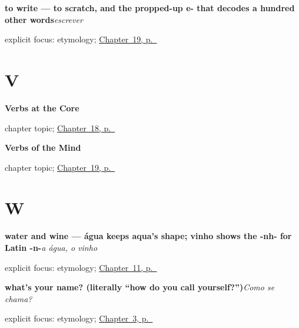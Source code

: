 \noindent\begin{minipage}[t]{\linewidth}
\raggedright
\textbf{to write — to scratch, and the propped-up e- that decodes a hundred other words}\enspace\emph{escrever}\par
\footnotesize explicit focus: etymology; \hyperref[ch:pt-mind-verbs]{Chapter~19, p.~\pageref*{ch:pt-mind-verbs}}
\end{minipage}\par\smallskip

\section*{V}

\noindent\begin{minipage}[t]{\linewidth}
\raggedright
\textbf{Verbs at the Core}\par
\footnotesize chapter topic; \hyperref[ch:pt-core-verbs]{Chapter~18, p.~\pageref*{ch:pt-core-verbs}}
\end{minipage}\par\smallskip

\noindent\begin{minipage}[t]{\linewidth}
\raggedright
\textbf{Verbs of the Mind}\par
\footnotesize chapter topic; \hyperref[ch:pt-mind-verbs]{Chapter~19, p.~\pageref*{ch:pt-mind-verbs}}
\end{minipage}\par\smallskip

\section*{W}

\noindent\begin{minipage}[t]{\linewidth}
\raggedright
\textbf{water and wine — água keeps aqua's shape; vinho shows the -nh- for Latin -n-}\enspace\emph{a água, o vinho}\par
\footnotesize explicit focus: etymology; \hyperref[ch:pt-bread-water-wine]{Chapter~11, p.~\pageref*{ch:pt-bread-water-wine}}
\end{minipage}\par\smallskip

\noindent\begin{minipage}[t]{\linewidth}
\raggedright
\textbf{what's your name? (literally \textquotedblleft{}how do you call yourself?\textquotedblright{})}\enspace\emph{Como se chama?}\par
\footnotesize explicit focus: etymology; \hyperref[ch:pt-introductions]{Chapter~3, p.~\pageref*{ch:pt-introductions}}
\end{minipage}\par\smallskip

